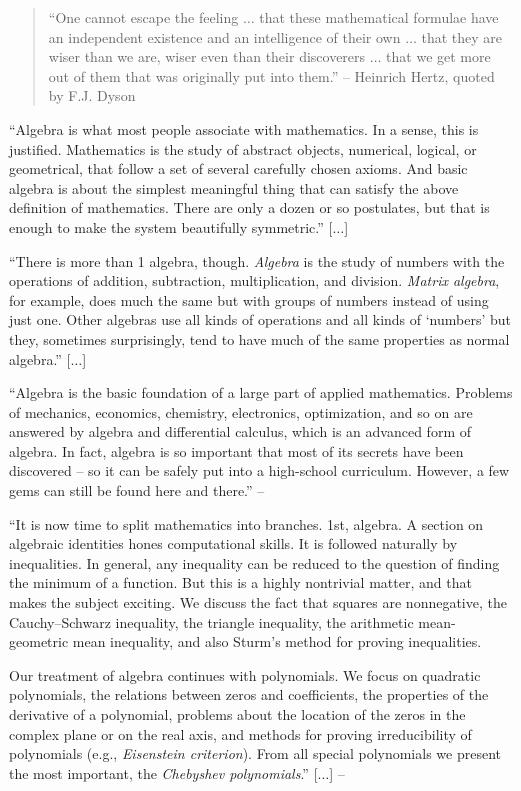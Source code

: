 \documentclass[oneside]{book}
\numberwithin{equation}{section}
\begin{document}
\begin{quotation}
	``One cannot escape the feeling $\ldots$ that these mathematical formulae have an independent existence and an intelligence of their own $\ldots$ that they are wiser than we are, wiser even than their discoverers $\ldots$ that we get more out of them that was originally put into them.'' -- Heinrich Hertz, quoted by F.J. Dyson
\end{quotation}
``Algebra is what most people associate with mathematics. In a sense, this is justified. Mathematics is the study of abstract objects, numerical, logical, or geometrical, that follow a set of several carefully chosen axioms. And basic algebra is about the simplest meaningful thing that can satisfy the above definition of mathematics. There are only a dozen or so postulates, but that is enough to make the system beautifully symmetric.'' [$\ldots$]

``There is more than 1 algebra, though. \textit{Algebra} is the study of numbers with the operations of addition, subtraction, multiplication, and division. \textit{Matrix algebra}, for example, does much the same but with groups of numbers instead of using just one. Other algebras use all kinds of operations and all kinds of `numbers' but they, sometimes surprisingly, tend to have much of the same properties as normal algebra.'' [$\ldots$]

``Algebra is the basic foundation of a large part of applied mathematics. Problems of mechanics, economics, chemistry, electronics, optimization, and so on are answered by algebra and differential calculus, which is an advanced form of algebra. In fact, algebra is so important that most of its secrets have been discovered -- so it can be safely put into a high-school curriculum. However, a few gems can still be found here and there.'' -- \cite[Chap. 3, p. 35]{Tao2006}

``It is now time to split mathematics into branches. 1st, algebra. A section on algebraic identities hones computational skills. It is followed naturally by inequalities. In general, any inequality can be reduced to the question of finding the minimum of a function. But this is a highly nontrivial matter, and that makes the subject exciting. We discuss the fact that squares are nonnegative, the Cauchy--Schwarz inequality, the triangle inequality, the arithmetic mean-geometric mean inequality, and also Sturm's method for proving inequalities.

Our treatment of algebra continues with polynomials. We focus on quadratic polynomials, the relations between zeros and coefficients, the properties of the derivative of a polynomial, problems about the location of the zeros in the complex plane or on the real axis, and methods for proving irreducibility of polynomials (e.g., \textit{Eisenstein criterion}). From all special polynomials we present the most important, the \textit{Chebyshev polynomials}.'' [$\ldots$] -- \cite[Chap. 2, p. 25]{Gelca_Andreescu2017}
\end{document}
